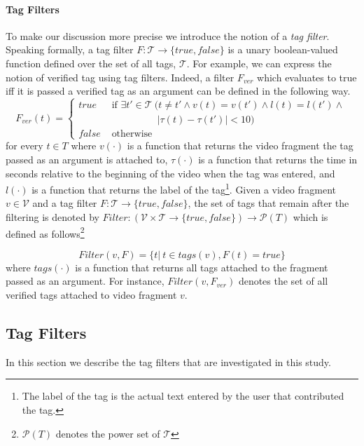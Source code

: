 \paragraph{Tag Filters} To make our discussion more precise 	we introduce the notion of a \textit{tag filter}. Speaking formally, a tag filter $F: \mathcal{T}\rightarrow\{true, false\}$ is a unary boolean-valued function defined over the set of all tags, $\mathcal{T}$. For example, we can express the notion of verified tag using tag filters. Indeed, a filter $F_{ver}$ which evaluates to true iff it is passed a verified tag as an argument can be defined in the following way.
\begin{equation*}
F_{ver}(t) = \left\{ 
	\begin{array}{rl}
	true &\mbox{ if $\exists t' \in \mathcal{T}~(t \neq t' \wedge v(t) = v(t') \wedge l(t) = l(t') \wedge $}\\
		& \mbox{~~~~~~~~~~~~~~ $|\tau(t) - \tau(t')| < 10)$} \\
	false &\mbox{ otherwise}
	\end{array}
\right.
\end{equation*}
for every $t \in T$ where $v(\cdot)$ is a function that returns the video fragment the tag passed as an argument is attached to,  $\tau(\cdot)$ is a function that returns the time in seconds relative to the beginning of the video when the tag was entered, and $l(\cdot)$ is a function that returns the label of the tag\footnote{The label of the tag is the actual text entered by the user that contributed the tag.}. Given a video fragment $v \in \mathcal{V}$ and a tag filter $F: \mathcal{T}\rightarrow\{true, false\}$, the set of tags that remain after the filtering is denoted by $Filter:(\mathcal{V} \times \mathcal{T}\rightarrow\{true, false\})\rightarrow \mathcal{P}({T})$ which is defined as follows\footnote{$\mathcal{P}({T})$ denotes the power set of $\mathcal{T}$}

\begin{equation}
Filter(v, F) = \{t |~t \in tags(v), F(t) = true\}
\end{equation}
where $tags(\cdot)$ is a function that returns all tags attached to the fragment passed as an argument.
For instance, $Filter(v, F_{ver})$ denotes the set of all verified tags attached to video fragment $v$.



\subsection{Tag Filters}\label{filter:sec:filters}
In this section we describe the tag filters that are investigated in this study.

